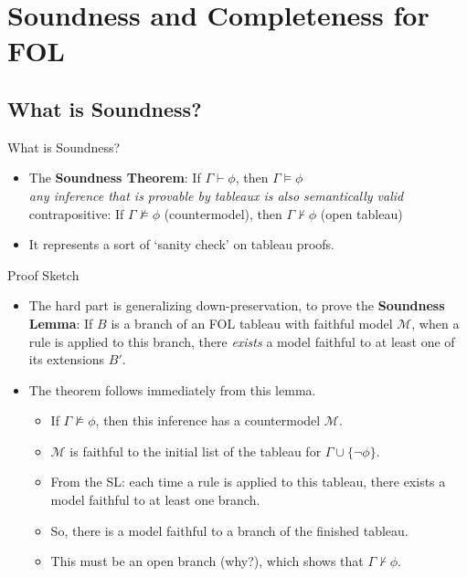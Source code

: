 \section{Soundness and Completeness for FOL}
\subsection{What is Soundness?}
\begin{frame}{What is Soundness?}

	\begin{itemize}%
	\itemsep=16pt
		
        \item The \textbf{Soundness Theorem}: If $\Gamma\vdash\phi$, then $\Gamma\vDash\phi$
	\\
	\alert{\emph{\small{any inference that is provable by tableaux is also semantically valid}}}
	\\
	{\small contrapositive: If $\Gamma\nvDash\phi$ (countermodel), then $\Gamma\nvdash\phi$ (open tableau)}

	\item It represents a sort of `sanity check' on tableau proofs.
	
	\end{itemize}

\end{frame}

\begin{frame}{Proof Sketch}

	\begin{itemize}%
	\itemsep=16pt

	\item The hard part is generalizing down-preservation, to prove the \textbf{Soundness Lemma}: 
	If $B$ is a branch of an FOL tableau with faithful model $\mathcal{M}$, when a rule is applied to this branch, there \emph{exists} a model faithful to at least one of its extensions $B'$.

	\item The theorem follows immediately from this lemma.
		\begin{itemize}%
		\item If $\Gamma\nvDash\phi$, then this inference has a countermodel $\mathcal{M}$.
		\item $\mathcal{M}$ is faithful to the initial list of the tableau for $\Gamma\cup\{\neg\phi\}$.
		\item From the SL: each time a rule is applied to this tableau, there exists a model faithful to at least one branch.
		\item So, there is a model faithful to a branch of the finished tableau.
		\item This must be an open branch \alert{(why?)}, which shows that $\Gamma\nvdash\phi$.
		\end{itemize}

	\end{itemize}

\end{frame}

